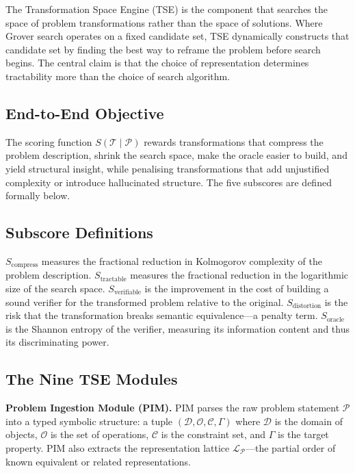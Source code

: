 The Transformation Space Engine (TSE) is the component that searches the space of problem transformations rather than the space of solutions. Where Grover search operates on a fixed candidate set, TSE dynamically constructs that candidate set by finding the best way to reframe the problem before search begins. The central claim is that the choice of representation determines tractability more than the choice of search algorithm.

\subsection{End-to-End Objective}


The scoring function $S(\mathcal{T} \mid \mathcal{P})$ rewards transformations that compress the problem description, shrink the search space, make the oracle easier to build, and yield structural insight, while penalising transformations that add unjustified complexity or introduce hallucinated structure. The five subscores are defined formally below.

\subsection{Subscore Definitions}


$S_{\text{compress}}$ measures the fractional reduction in Kolmogorov complexity of the problem description. $S_{\text{tractable}}$ measures the fractional reduction in the logarithmic size of the search space. $S_{\text{verifiable}}$ is the improvement in the cost of building a sound verifier for the transformed problem relative to the original. $S_{\text{distortion}}$ is the risk that the transformation breaks semantic equivalence---a penalty term. $S_{\text{oracle}}$ is the Shannon entropy of the verifier, measuring its information content and thus its discriminating power.

\subsection{The Nine TSE Modules}

\textbf{Problem Ingestion Module (PIM).} PIM parses the raw problem statement $\mathcal{P}$ into a typed symbolic structure: a tuple $(\mathcal{D}, \mathcal{O}, \mathcal{C}, \Gamma)$ where $\mathcal{D}$ is the domain of objects, $\mathcal{O}$ is the set of operations, $\mathcal{C}$ is the constraint set, and $\Gamma$ is the target property. PIM also extracts the representation lattice $\mathcal{L}_{\mathcal{P}}$---the partial order of known equivalent or related representations.

